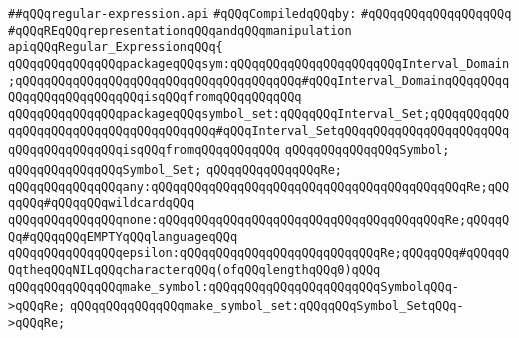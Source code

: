 \label{src/app/future-lex/src/regular-expression.api}
\verb|##qQQqregular-expression.api|\newline
\newline
\verb|#qQQqCompiledqQQqby:|\newline
\verb|#qQQqqQQqqQQqqQQqqQQq|\newline
\newline
\newline
\newline
\verb|#qQQqREqQQqrepresentationqQQqandqQQqmanipulation|\newline
\newline
\newline
\newline
\verb|apiqQQqRegular_ExpressionqQQq{|\newline
\newline
\verb|qQQqqQQqqQQqqQQqpackageqQQqsym:qQQqqQQqqQQqqQQqqQQqqQQqInterval_Domain;qQQqqQQqqQQqqQQqqQQqqQQqqQQqqQQqqQQqqQQq#qQQqInterval_DomainqQQqqQQqqQQqqQQqqQQqqQQqqQQqisqQQqfromqQQqqQQqqQQq|\newline
\verb|qQQqqQQqqQQqqQQqpackageqQQqsymbol_set:qQQqqQQqInterval_Set;qQQqqQQqqQQqqQQqqQQqqQQqqQQqqQQqqQQqqQQq#qQQqInterval_SetqQQqqQQqqQQqqQQqqQQqqQQqqQQqqQQqqQQqqQQqisqQQqfromqQQqqQQqqQQq|\newline
\newline
\verb|qQQqqQQqqQQqqQQqSymbol;|\newline
\verb|qQQqqQQqqQQqqQQqSymbol_Set;|\newline
\verb|qQQqqQQqqQQqqQQqRe;|\newline
\newline
\verb|qQQqqQQqqQQqqQQqany:qQQqqQQqqQQqqQQqqQQqqQQqqQQqqQQqqQQqqQQqqQQqRe;qQQqqQQq#qQQqqQQqwildcardqQQq|\newline
\verb|qQQqqQQqqQQqqQQqnone:qQQqqQQqqQQqqQQqqQQqqQQqqQQqqQQqqQQqqQQqRe;qQQqqQQq#qQQqqQQqEMPTYqQQqlanguageqQQq|\newline
\verb|qQQqqQQqqQQqqQQqepsilon:qQQqqQQqqQQqqQQqqQQqqQQqqQQqRe;qQQqqQQq#qQQqqQQqtheqQQqNILqQQqcharacterqQQq(ofqQQqlengthqQQq0)qQQq|\newline
\newline
\verb|qQQqqQQqqQQqqQQqmake_symbol:qQQqqQQqqQQqqQQqqQQqqQQqSymbolqQQq->qQQqRe;|\newline
\verb|qQQqqQQqqQQqqQQqmake_symbol_set:qQQqqQQqSymbol_SetqQQq->qQQqRe;|\newline
